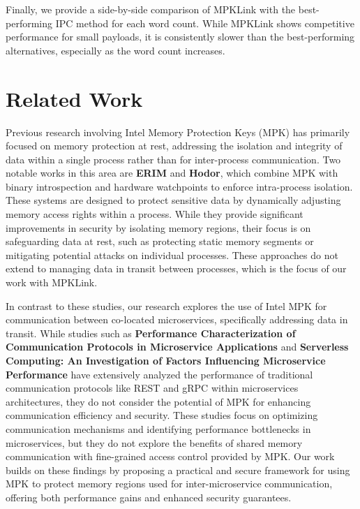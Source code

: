 \documentclass[letterpaper,twocolumn,10pt]{article}
\begin{document}
Finally, we provide a side-by-side comparison of MPKLink with the best-performing IPC method for each word count. While MPKLink shows competitive performance for small payloads, it is consistently slower than the best-performing alternatives, especially as the word count increases.


\section{Related Work}
Previous research involving Intel Memory Protection Keys (MPK) has primarily focused on memory protection at rest, addressing the isolation and integrity of data within a single process rather than for inter-process communication.
Two notable works in this area are \textbf{ERIM}\cite{vahldiek2019erim} and \textbf{Hodor}\cite{hedayati2019hodor}, which combine MPK with binary introspection and hardware watchpoints to enforce intra-process isolation.
These systems are designed to protect sensitive data by dynamically adjusting memory access rights within a process.
While they provide significant improvements in security by isolating memory regions, their focus is on safeguarding data at rest, such as protecting static memory segments or mitigating potential attacks on individual processes.
These approaches do not extend to managing data in transit between processes, which is the focus of our work with MPKLink.

In contrast to these studies, our research explores the use of Intel MPK for communication between co-located microservices, specifically addressing data in transit.
While studies such as \textbf{Performance Characterization of Communication Protocols in Microservice Applications} and \textbf{Serverless Computing: An Investigation of Factors Influencing Microservice Performance} have extensively analyzed the performance of traditional communication protocols like REST and gRPC within microservices architectures, they do not consider the potential of MPK for enhancing communication efficiency and security.
These studies focus on optimizing communication mechanisms and identifying performance bottlenecks in microservices, but they do not explore the benefits of shared memory communication with fine-grained access control provided by MPK.
Our work builds on these findings by proposing a practical and secure framework for using MPK to protect memory regions used for inter-microservice communication, offering both performance gains and enhanced security guarantees.


\end{document}
